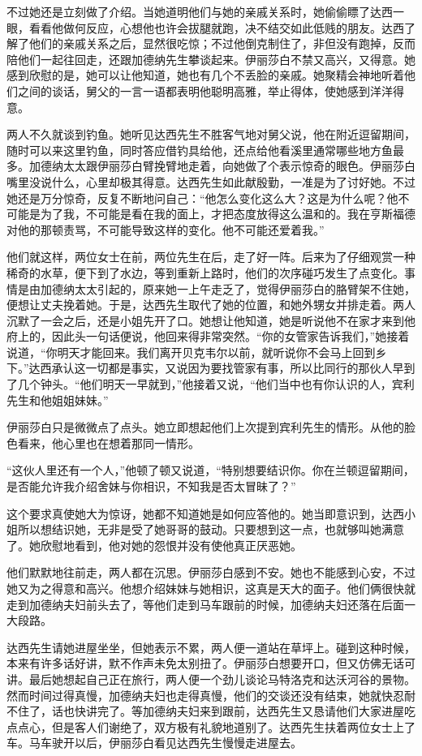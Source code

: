 \par 不过她还是立刻做了介绍。当她道明他们与她的亲戚关系时，她偷偷瞟了达西一眼，看看他做何反应，心想他也许会拔腿就跑，决不结交如此低贱的朋友。达西了解了他们的亲戚关系之后，显然很吃惊；不过他倒克制住了，非但没有跑掉，反而陪他们一起往回走，还跟加德纳先生攀谈起来。伊丽莎白不禁又高兴，又得意。她感到欣慰的是，她可以让他知道，她也有几个不丢脸的亲戚。她聚精会神地听着他们之间的谈话，舅父的一言一语都表明他聪明高雅，举止得体，使她感到洋洋得意。
\par 两人不久就谈到钓鱼。她听见达西先生不胜客气地对舅父说，他在附近逗留期间，随时可以来这里钓鱼，同时答应借钓具给他，还点给他看溪里通常哪些地方鱼最多。加德纳太太跟伊丽莎白臂挽臂地走着，向她做了个表示惊奇的眼色。伊丽莎白嘴里没说什么，心里却极其得意。达西先生如此献殷勤，一准是为了讨好她。不过她还是万分惊奇，反复不断地问自己：“他怎么变化这么大？这是为什么呢？他不可能是为了我，不可能是看在我的面上，才把态度放得这么温和的。我在亨斯福德对他的那顿责骂，不可能导致这样的变化。他不可能还爱着我。”
\par 他们就这样，两位女士在前，两位先生在后，走了好一阵。后来为了仔细观赏一种稀奇的水草，便下到了水边，等到重新上路时，他们的次序碰巧发生了点变化。事情是由加德纳太太引起的，原来她一上午走乏了，觉得伊丽莎白的胳臂架不住她，便想让丈夫挽着她。于是，达西先生取代了她的位置，和她外甥女并排走着。两人沉默了一会之后，还是小姐先开了口。她想让他知道，她是听说他不在家才来到他府上的，因此头一句话便说，他回来得非常突然。“你的女管家告诉我们，”她接着说道，“你明天才能回来。我们离开贝克韦尔以前，就听说你不会马上回到乡下。”达西承认这一切都是事实，又说因为要找管家有事，所以比同行的那伙人早到了几个钟头。“他们明天一早就到，”他接着又说，“他们当中也有你认识的人，宾利先生和他姐姐妹妹。”
\par 伊丽莎白只是微微点了点头。她立即想起他们上次提到宾利先生的情形。从他的脸色看来，他心里也在想着那同一情形。
\par “这伙人里还有一个人，”他顿了顿又说道，“特别想要结识你。你在兰顿逗留期间，是否能允许我介绍舍妹与你相识，不知我是否太冒昧了？”
\par 这个要求真使她大为惊讶，她都不知道她是如何应答他的。她当即意识到，达西小姐所以想结识她，无非是受了她哥哥的鼓动。只要想到这一点，也就够叫她满意了。她欣慰地看到，他对她的怨恨并没有使他真正厌恶她。
\par 他们默默地往前走，两人都在沉思。伊丽莎白感到不安。她也不能感到心安，不过她又为之得意和高兴。他想介绍妹妹与她相识，这真是天大的面子。他们俩很快就走到加德纳夫妇前头去了，等他们走到马车跟前的时候，加德纳夫妇还落在后面一大段路。
\par 达西先生请她进屋坐坐，但她表示不累，两人便一道站在草坪上。碰到这种时候，本来有许多话好讲，默不作声未免太别扭了。伊丽莎白想要开口，但又仿佛无话可讲。最后她想起自己正在旅行，两人便一个劲儿谈论马特洛克和达沃河谷的景物。然而时间过得真慢，加德纳夫妇也走得真慢，他们的交谈还没有结束，她就快忍耐不住了，话也快讲完了。等加德纳夫妇来到跟前，达西先生又恳请他们大家进屋吃点点心，但是客人们谢绝了，双方极有礼貌地道别了。达西先生扶着两位女士上了车。马车驶开以后，伊丽莎白看见达西先生慢慢走进屋去。
